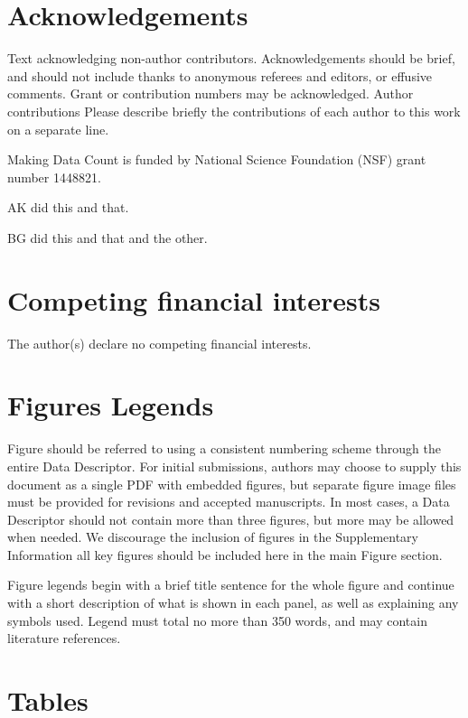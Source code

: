 \documentclass[english]{article}
\begin{document}
\section*{Acknowledgements}



Text acknowledging non-author contributors. Acknowledgements should
be brief, and should not include thanks to anonymous referees and
editors, or effusive comments. Grant or contribution numbers may be
acknowledged. Author contributions Please describe briefly the contributions
of each author to this work on a separate line. 

Making Data Count is funded by National Science Foundation (NSF) grant number 1448821.

AK did this and that. 

BG did this and that and the other. 


\section*{Competing financial interests}


The author(s) declare no competing financial interests.


\section*{Figures Legends}

Figure should be referred to using a consistent numbering scheme through
the entire Data Descriptor. For initial submissions, authors may choose
to supply this document as a single PDF with embedded figures, but
separate figure image files must be provided for revisions and accepted
manuscripts. In most cases, a Data Descriptor should not contain more
than three figures, but more may be allowed when needed. We discourage
the inclusion of figures in the Supplementary Information \textendash{}
all key figures should be included here in the main Figure section. 

Figure legends begin with a brief title sentence for the whole figure
and continue with a short description of what is shown in each panel,
as well as explaining any symbols used. Legend must total no more
than 350 words, and may contain literature references. 


\section*{Tables}
\end{document}
